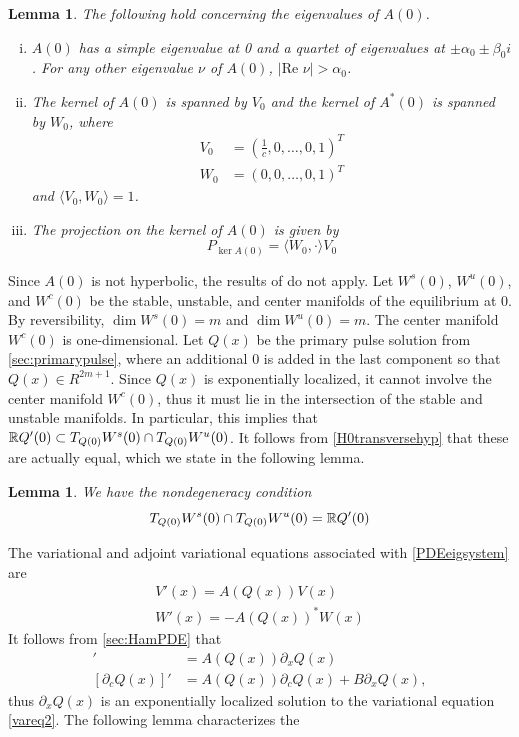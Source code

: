 \documentclass[11pt,reqno]{amsart}
\theoremstyle{plain}
\newtheorem{lemma}[theorem]{Lemma}
\theoremstyle{definition}
\theoremstyle{remark}
\begin{document}
\begin{lemma}\label{eigA0lemma}
The following hold concerning the eigenvalues of $A(0)$.
\begin{enumerate}[(i)]
\item $A(0)$ has a simple eigenvalue at 0 and a quartet of eigenvalues at $\pm \alpha_0 \pm \beta_0 i$. For any other eigenvalue $\nu$ of $A(0)$, $|\text{Re }\nu| > \alpha_0$.
\item The kernel of $A(0)$ is spanned by $V_0$ and the kernel of $A^*(0)$ is spanned by $W_0$, where
\begin{align}
V_0 &= \left(\frac{1}{c}, 0, \dots, 0, 1\right)^T \label{V0} \\
W_0 &= (0, 0, \dots, 0, 1)^T \label{W0}
\end{align}
and $\langle V_0, W_0 \rangle = 1$.
\item The projection on the kernel of $A(0)$ is given by
\begin{equation}\label{projkernelA0}
P_{\ker A(0)} = \langle W_0, \cdot \rangle V_0
\end{equation}
\end{enumerate} 
\end{lemma}

Since $A(0)$ is not hyperbolic, the results of \cite{Sandstede1998} do not apply. Let $W^s(0)$, $W^u(0)$, and $W^c(0)$ be the stable, unstable, and center manifolds of the equilibrium at 0. By reversibility, $\dim W^s(0) = m$ and $\dim W^u(0) = m$. The center manifold $W^c(0)$ is one-dimensional. Let $Q(x)$ be the primary pulse solution from \cref{sec:primarypulse}, where an additional 0 is added in the last component so that $Q(x) \in R^{2m+1}$. Since $Q(x)$ is exponentially localized, it cannot involve the center manifold $W^c(0)$, thus it must lie in the intersection of the stable and unstable manifolds. In particular, this implies that $\mathbb{R} Q'(0) \subset T_{Q(0)}W^s(0) \cap T_{Q(0)}W^u(0)$. It follows from \cref{H0transversehyp} that these are actually equal, which we state in the following lemma.

\begin{lemma}\label{nondegenlemma}
We have the nondegeneracy condition
\begin{equation}\label{nondegen2}
T_{Q(0)}W^s(0) \cap T_{Q(0)}W^u(0) = \mathbb{R} Q'(0)
\end{equation}
\end{lemma}

The variational and adjoint variational equations associated with \cref{PDEeigsystem} are
\begin{align}
V'(x) = A(Q(x)) V(x) \label{vareq2} \\
W'(x) = -A(Q(x))^* W(x) \label{adjvareq2}
\end{align}
It follows from \cref{sec:HamPDE} that 
\begin{align}
[\partial_x Q(x)]' &= A(Q(x))\partial_x Q(x) \label{Qprimevarsol} \\
[\partial_c Q(x)]' &= A(Q(x))\partial_c Q(x) + B \partial_x Q(x), \label{Qcvarsol}
\end{align}
thus $\partial_x Q(x)$ is an exponentially localized solution to the variational equation \eqref{vareq2}. The following lemma characterizes the 
\end{document}
